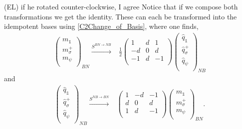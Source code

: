 \documentclass[12pt,a4paper]{article}
\newcounter{arrow}
\newcommand{\unit}{\mathds{1}}
\newcommand{\ethan}[1]{{\color{amethyst}\footnotesize{(EL) #1}}}
\begin{document}
\ethan{if he rotated counter-clockwise, I agree}
Notice that if we compose both transformations we get the identity. 
These can each be transformed into the idempotent bases using \eqref{C2Change_of_Basis}, 
where one finds,
\begin{align}
\left( \begin{matrix}
m_\unit\\
m_\sigma^+\\
m_\psi\\
\end{matrix} \right)_{BN} 
\xrightarrow{S^{BN \rightarrow NB}} &\frac{1}{2} \left( \begin{matrix}
1&d&1\\
-d&0&d\\
-1&d&-1\\
\end{matrix} \right)
\left( \begin{matrix}
\hat{q}_\unit\\
\hat{q}_\sigma^+\\
\hat{q}_\psi\\
\end{matrix} \right)_{NB}
\end{align}
and
\begin{align}
\left( \begin{matrix}
\hat{q}_\unit\\
\hat{q}_\sigma^+\\
\hat{q}_\psi\\
\end{matrix} \right)_{NB} 
\xrightarrow{S^{NB \rightarrow BN}} & \left( \begin{matrix}
1&-d&-1\\
d&0&d\\
1&d&-1\\
\end{matrix} \right)
\left( \begin{matrix}
m_\unit\\
m_\sigma^+\\
m_\psi\\
\end{matrix} \right)_{BN}.
\end{align}
\end{document}
